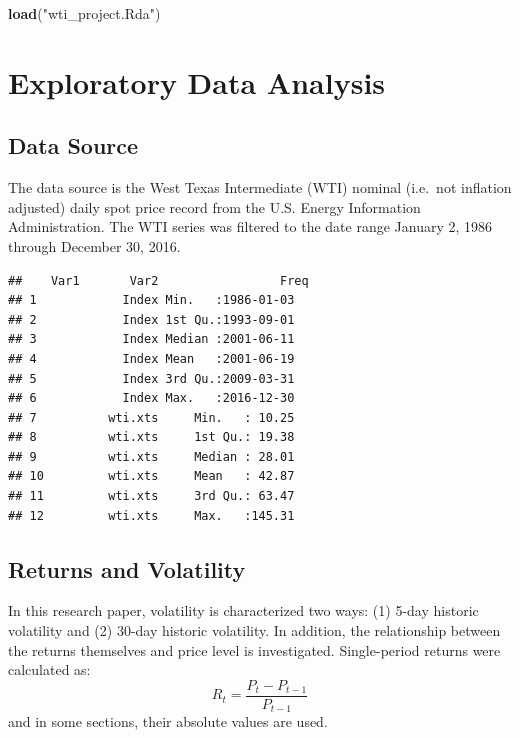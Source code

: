 \documentclass[11pt,]{article}
\newenvironment{Shaded}{\begin{snugshade}}{\end{snugshade}}
\newcommand{\KeywordTok}[1]{\textcolor[rgb]{0.13,0.29,0.53}{\textbf{{#1}}}}
\newcommand{\StringTok}[1]{\textcolor[rgb]{0.31,0.60,0.02}{{#1}}}
\newcommand{\NormalTok}[1]{{#1}}
\begin{document}
\begin{Shaded}
\begin{Highlighting}[]
\KeywordTok{load}\NormalTok{(}\StringTok{"wti_project.Rda"}\NormalTok{)}
\end{Highlighting}
\end{Shaded}

\section{Exploratory Data Analysis}\label{exploratory-data-analysis}

\subsection{Data Source}\label{data-source}

The data source is the West Texas Intermediate (WTI) nominal (i.e.~not
inflation adjusted) daily spot price record from the U.S. Energy
Information Administration. The WTI series was filtered to the date
range January 2, 1986 through December 30, 2016.

\begin{Shaded}
\end{Shaded}

\begin{verbatim}
##    Var1       Var2                 Freq
## 1            Index Min.   :1986-01-03  
## 2            Index 1st Qu.:1993-09-01  
## 3            Index Median :2001-06-11  
## 4            Index Mean   :2001-06-19  
## 5            Index 3rd Qu.:2009-03-31  
## 6            Index Max.   :2016-12-30  
## 7          wti.xts     Min.   : 10.25  
## 8          wti.xts     1st Qu.: 19.38  
## 9          wti.xts     Median : 28.01  
## 10         wti.xts     Mean   : 42.87  
## 11         wti.xts     3rd Qu.: 63.47  
## 12         wti.xts     Max.   :145.31
\end{verbatim}

\subsection{Returns and Volatility}\label{returns-and-volatility}

In this research paper, volatility is characterized two ways: (1) 5-day
historic volatility and (2) 30-day historic volatility. In addition, the
relationship between the returns themselves and price level is
investigated. Single-period returns were calculated as:
\[R_t = \frac{P_t-P_{t-1}}{P_{t-1}}\] and in some sections, their
absolute values are used.
\end{document}
